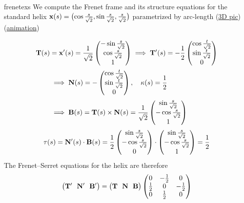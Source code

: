 \begin{examples}{}{frenetexs}
	\exstart We compute the Frenet frame and its structure equations for the standard helix ${\mathbf{x}}(s)=\bigl(\cos\frac s{\sqrt 2},\sin\frac s{\sqrt 2},\frac s{\sqrt 2}\bigr)$ parametrized by arc-length (\href{http://www.math.uci.edu/~ndonalds/math162a/frenet-helixstill.html}{3D pic})(\href{http://www.math.uci.edu/~ndonalds/math162a/frenet-helixanim.html}{animation})\par
		\begin{enumerate}\setcounter{enumi}{1}
			\begin{minipage}[t]{0.71\linewidth}\vspace{-8pt}
				\item[]\begin{gather*}
				\begin{aligned}
					{\mathbf{T}}(s)&={\mathbf{x}}'(s) =\frac 1{\sqrt 2}\begin{pmatrix}-\sin\frac s{\sqrt 2}\\\cos\frac s{\sqrt 2}\\1\end{pmatrix}\implies {\mathbf{T}}'(s)=-\frac 12\begin{pmatrix}\cos\frac t{\sqrt 2}\\\sin\frac t{\sqrt 2}\\0\end{pmatrix}\\
					&\implies {\mathbf{N}}(s) =-\begin{pmatrix}\cos\frac t{\sqrt 2}\\\sin\frac t{\sqrt 2}\\0\end{pmatrix},\quad\kappa(s) =\frac 12\\
					&\implies {\mathbf{B}}(s) ={\mathbf{T}}(s)\times{\mathbf{N}}(s) =\frac 1{\sqrt 2}\begin{pmatrix}\sin\frac s{\sqrt 2}\\-\cos\frac s{\sqrt 2}\\1\end{pmatrix}
				\end{aligned}\\
				\tau(s) ={\mathbf{N}}'(s)\cdot{\mathbf{B}}(s) =\frac 1{2}\begin{pmatrix}\sin\frac s{\sqrt 2}\\-\cos\frac s{\sqrt 2}\\0\end{pmatrix}\cdot\begin{pmatrix}\sin\frac s{\sqrt 2}\\-\cos\frac s{\sqrt 2}\\1\end{pmatrix}=\frac 12
			\end{gather*}
			The Frenet--Serret equations for the helix are therefore
			\[
				\bigl({\mathbf{T}}'\ \ {\mathbf{N}}'\ \ {\mathbf{B}}'\bigr)
				=
				\bigl({\mathbf{T}}\ \ {\mathbf{N}}\ \ {\mathbf{B}}\bigr)
				\begin{pmatrix}
		    	0&-\frac 12&0\\
					\frac 12&0&-\frac 12\\
					0&\frac 12&0
				\end{pmatrix}
			\]
		\end{minipage}
		\hfill
		\begin{minipage}[t]{0.28\linewidth}\vspace{-15pt}

\end{minipage}
\end{enumerate}
\end{examples}
